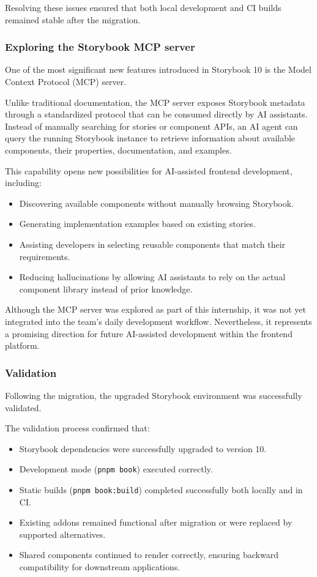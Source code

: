 Resolving these issues ensured that both local development and CI builds remained stable after the migration.

\subsubsection{Exploring the Storybook MCP server}

One of the most significant new features introduced in Storybook 10 is the Model Context Protocol (MCP) server.

Unlike traditional documentation, the MCP server exposes Storybook metadata through a standardized protocol that can be consumed directly by AI assistants. Instead of manually searching for stories or component APIs, an AI agent can query the running Storybook instance to retrieve information about available components, their properties, documentation, and examples.

This capability opens new possibilities for AI-assisted frontend development, including:

\begin{itemize}
    \item Discovering available components without manually browsing Storybook.
    \item Generating implementation examples based on existing stories.
    \item Assisting developers in selecting reusable components that match their requirements.
    \item Reducing hallucinations by allowing AI assistants to rely on the actual component library instead of prior knowledge.
\end{itemize}

Although the MCP server was explored as part of this internship, it was not yet integrated into the team's daily development workflow. Nevertheless, it represents a promising direction for future AI-assisted development within the frontend platform.

\subsubsection{Validation}

Following the migration, the upgraded Storybook environment was successfully validated.

The validation process confirmed that:

\begin{itemize}
    \item Storybook dependencies were successfully upgraded to version 10.
    \item Development mode (\lstinline|pnpm book|) executed correctly.
    \item Static builds (\lstinline|pnpm book:build|) completed successfully both locally and in CI.
    \item Existing addons remained functional after migration or were replaced by supported alternatives.
    \item Shared components continued to render correctly, ensuring backward compatibility for downstream applications.
\end{itemize}

